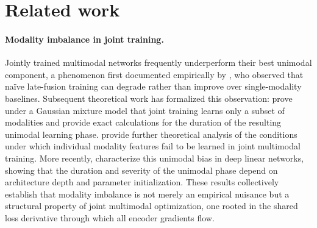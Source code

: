 \documentclass{article}
\begin{document}
\section{Related work}
\label{sec:related}

\paragraph{Modality imbalance in joint training.}

Jointly trained multimodal networks frequently underperform their best unimodal component, a phenomenon first documented empirically by \citet{wang2020gblending}, who observed that na\"ive late-fusion training can degrade rather than improve over single-modality baselines. Subsequent theoretical work has formalized this observation: \citet{huang2022modality} prove under a Gaussian mixture model that joint training learns only a subset of modalities and provide exact calculations for the duration of the resulting unimodal learning phase. \citet{du2023suppression} provide further theoretical analysis of the conditions under which individual modality features fail to be learned in joint multimodal training. More recently, \citet{zhang2024unimodal} characterize this unimodal bias in deep linear networks, showing that the duration and severity of the unimodal phase depend on architecture depth and parameter initialization. These results collectively establish that modality imbalance is not merely an empirical nuisance but a structural property of joint multimodal optimization, one rooted in the shared loss derivative through which all encoder gradients flow.


\end{document}
